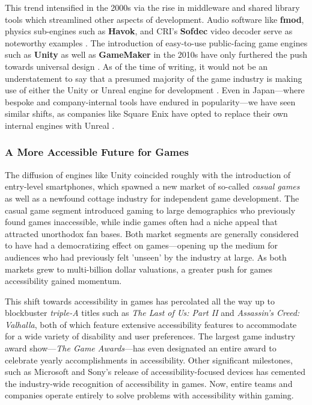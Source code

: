 \documentclass{report}
\newcommand{\tech}[1]{\textbf{#1}}
\begin{document}
This trend intensified in the 2000s via the rise in middleware and shared library tools which streamlined other aspects of development. Audio software like \tech{fmod}, physics sub-engines such as \tech{Havok}, and CRI's \tech{Sofdec} video decoder serve as noteworthy examples \cite{Foley_2015}. The introduction of easy-to-use public-facing game engines such as \tech{Unity} as well as \tech{GameMaker} in the 2010s have only furthered the push towards universal design \cite{Cobbett_2017}. As of the time of writing, it would not be an understatement to say that a presumed majority of the game industry is making use of either the Unity or Unreal engine for development \cite{CBResearch_2018}. Even in Japan---where bespoke and company-internal tools have endured in popularity---we have seen similar shifts, as companies like Square Enix have opted to replace their own internal engines with Unreal \cite{Sinclair_2012}.

\subsubsection{A More Accessible Future for Games}
The diffusion of engines like Unity coincided roughly with the introduction of entry-level smartphones, which spawned a new market of so-called \emph{casual games} as well as a newfound cottage industry for independent game development. The casual game segment introduced gaming to large demographics who previously found games inaccessible, while indie games often had a niche appeal that attracted unorthodox fan bases. Both market segments are generally considered to have had a democratizing effect on games---opening up the medium for audiences who had previously felt 'unseen' by the industry at large. As both markets grew to multi-billion dollar valuations, a greater push for games accessibility gained momentum. 

This shift towards accessibility in games has percolated all the way up to blockbuster \emph{triple-A} titles such as \emph{The Last of Us: Part II} and \emph{Assassin's Creed: Valhalla}, both of which feature extensive accessibility features to accommodate for a wide variety of disability and user preferences. The largest game industry award show---\emph{The Game Awards}---has even designated an entire award to celebrate yearly accomplishments in accessibility. Other significant milestones, such as Microsoft and Sony's release of accessibility-focused devices has cemented the industry-wide recognition of accessibility in games. Now, entire teams and companies operate entirely to solve problems with accessibility within gaming.  
\end{document}
